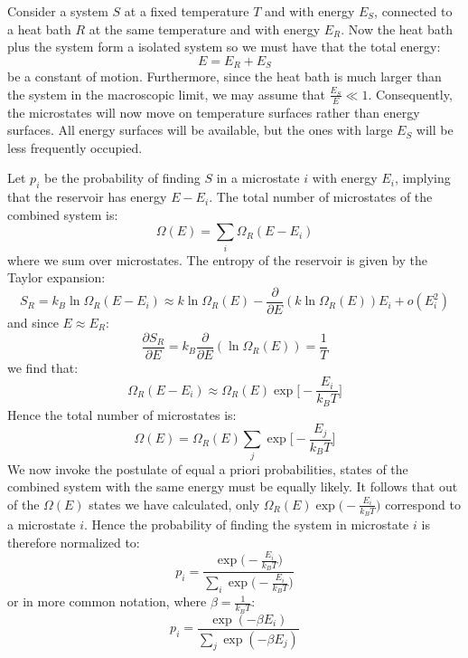 \documentclass[a4paper,11pt,oneside]{book}
\begin{document}
Consider a system $S$ at a fixed temperature $T$ and with energy $E_S$, connected to a heat bath $R$ at the same temperature and with energy $E_R$. Now the heat bath plus the system form a isolated system so we must have that the total energy:
\begin{equation}
    E = E_R+E_S
\end{equation}
be a constant of motion. Furthermore, since the heat bath is much larger than the system in the macroscopic limit, we may assume that $\frac{E_S}{E} \ll 1$. Consequently, the microstates will now move on temperature surfaces rather than energy surfaces. All energy surfaces will be available, but the ones with large $E_S$ will be less frequently occupied. 


Let $p_i$ be the probability of finding $S$ in a microstate $i$ with energy $E_i$, implying that the reservoir has energy $E-E_i$. The total number of microstates of the combined system is:
\begin{equation}
    \Omega(E) = \sum_i \Omega_R(E-E_i)
\end{equation}
where we sum over microstates. The entropy of the reservoir is given by the Taylor expansion:
\begin{equation}
   S_R= k_B\ln \Omega_R(E-E_i) \approx k \ln \Omega_R(E) - \frac{\partial}{\partial E}(k \ln \Omega_R(E))E_i+o(E_i^2)
\end{equation}
and since $E \approx E_R$:
\begin{equation}
    \frac{\partial S_R}{\partial E} = k_B\frac{\partial}{\partial E}(\ln \Omega_R(E)) = \frac{1}{T}
\end{equation}
we find that:
\begin{equation}
    \Omega_R(E-E_i) \approx \Omega_R(E) \exp \bigg[-\frac{E_i}{k_BT}\bigg]
\end{equation}
Hence the total number of microstates is:
\begin{equation}
    \Omega(E) = \Omega_R(E)  \sum_j \exp \bigg[-\frac{E_j}{k_BT}\bigg]
\end{equation}
We now invoke the postulate of equal a priori probabilities, states of the combined system with the same energy must be equally likely. It follows that out of the $\Omega(E)$ states we have calculated, only $\Omega_R(E) \exp \big(-\frac{E_i}{k_BT}\big)$ correspond to a microstate $i$. Hence the probability of finding the system in microstate $i$ is therefore normalized to:
\begin{equation}
    p_i = \frac{ \exp \Big(-\frac{E_i}{k_BT}\Big)}{\sum \limits_i  \exp \Big(-\frac{E_i}{k_BT}\Big)}
\end{equation}
or in more common notation, where $\beta = \frac{1}{k_BT}$:
\begin{equation}\label{discrete can}
    \boxed{p_i = \frac{ \exp (-\beta E_i)}{\sum_j  \exp (-\beta E_j)}}
\end{equation}
\end{document}
